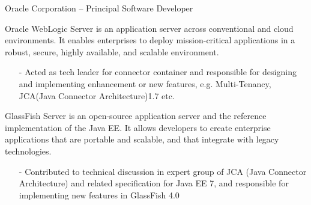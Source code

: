 \documentclass[10pt,a4paper]{moderncv}
\begin{document}
{ Oracle Corporation -- Principal Software Developer}{}{}{}{}
\vspace{1ex}
{
  Oracle WebLogic Server is an application server across conventional and cloud environments. It enables enterprises to deploy mission-critical applications in a robust, secure, highly available, and scalable environment.
  \begin{itemize}
    \item[-] Acted as tech leader for connector container and responsible for designing and implementing enhancement or
               new features, e.g. Multi-Tenancy, JCA(Java Connector Architecture)1.7 etc.
  \end{itemize}
}

\vspace*{0.2\baselineskip}
{
  GlassFish Server is an open-source application server  and the reference implementation of the Java EE. It allows developers to create enterprise
  applications that are portable and scalable,  and that integrate with legacy technologies.
  \begin{itemize}
    \item[-]Contributed to technical discussion in expert group of JCA (Java Connector Architecture) and related specification for Java EE 7, and responsible for implementing new features in GlassFish 4.0
  \end{itemize}
}
\end{document}
